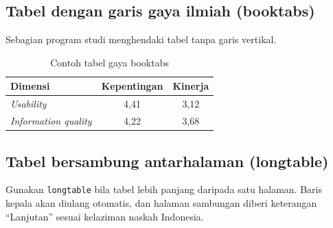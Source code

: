 \subsection{Tabel dengan garis gaya ilmiah (booktabs)}
Sebagian program studi menghendaki tabel tanpa garis vertikal.

\begin{table}[H]
    \centering
    \caption{Contoh tabel gaya booktabs}
    \label{tab:g-booktabs}
    \begin{tabular}{lcc}
        \toprule
        \textbf{Dimensi} & \textbf{Kepentingan} & \textbf{Kinerja} \\
        \midrule
        \textit{Usability}           & 4,41 & 3,12 \\
        \textit{Information quality} & 4,22 & 3,68 \\
        \bottomrule
    \end{tabular}
\end{table}

\subsection{Tabel bersambung antarhalaman (longtable)}
Gunakan \texttt{longtable} bila tabel lebih panjang daripada satu halaman.
Baris kepala akan diulang otomatis, dan halaman sambungan diberi keterangan
``Lanjutan'' sesuai kelaziman naskah Indonesia.

